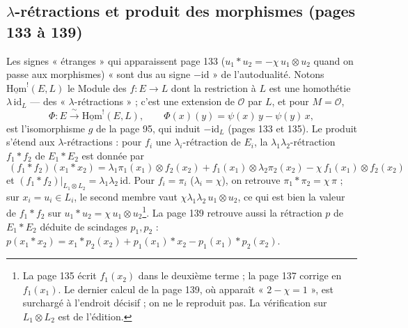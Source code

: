 \documentclass[11pt,a4paper]{article}
\begin{document}

\subsection*{$\lambda$-rétractions et produit des morphismes (pages 133 à 139)}

Les signes « étranges » qui apparaissent page 133 ($u_1 * u_2 = -\chi\, u_1 \otimes u_2$
quand on passe aux morphismes) « sont dus au signe $-\mathrm{id}$ » de l'autodualité.
Notons $\underline{\mathrm{Hom}}^{!}(E, L)$ le Module des $f : E \to L$ dont la
restriction à $L$ est une homothétie $\lambda\,\mathrm{id}_L$ --- des
« $\lambda$-rétractions » ; c'est une extension de $\mathcal{O}$ par $L$, et pour $M =
\mathcal{O}$,
\[
  \Phi : E \xrightarrow{\ \sim\ } \underline{\mathrm{Hom}}^{!}(E, L), \qquad
  \Phi(x)(y) = \psi(x)\,y - \psi(y)\,x ,
\]
est l'isomorphisme $g$ de la page 95, qui induit $-\mathrm{id}_L$ (pages 133 et 135).
Le produit s'étend aux $\lambda$-rétractions : pour $f_i$ une $\lambda_i$-rétraction de
$E_i$, la $\lambda_1\lambda_2$-rétraction $f_1 * f_2$ de $E_1 * E_2$ est donnée par
\[
  \boxed{\ (f_1 * f_2)(x_1 * x_2) = \lambda_1\pi_1(x_1) \otimes f_2(x_2) + f_1(x_1) \otimes \lambda_2\pi_2(x_2)
  - \chi\, f_1(x_1) \otimes f_2(x_2)\ }
\]
et $(f_1 * f_2)|_{L_1 \otimes L_2} = \lambda_1\lambda_2\,\mathrm{id}$. Pour $f_i = \pi_i$
($\lambda_i = \chi$), on retrouve $\pi_1 * \pi_2 = \chi\,\pi$ ; sur $x_i = u_i \in L_i$, le
second membre vaut $\chi\lambda_1\lambda_2\, u_1 \otimes u_2$, ce qui est bien la valeur de
$f_1 * f_2$ sur $u_1 * u_2 = \chi\, u_1 \otimes u_2$\footnote{La page 135 écrit
$f_1(x_2)$ dans le deuxième terme ; la page 137 corrige en $f_1(x_1)$. Le dernier
calcul de la page 139, où apparaît « $2 - \chi = 1$ », est surchargé à l'endroit
décisif ; on ne le reproduit pas. La vérification sur $L_1 \otimes L_2$ est de
l'édition.}. La page 139 retrouve aussi la rétraction $p$ de $E_1 * E_2$ déduite de
scindages $p_1, p_2$ : $p(x_1 * x_2) = x_1 * p_2(x_2) + p_1(x_1) * x_2 - p_1(x_1) * p_2(x_2)$.
\end{document}

